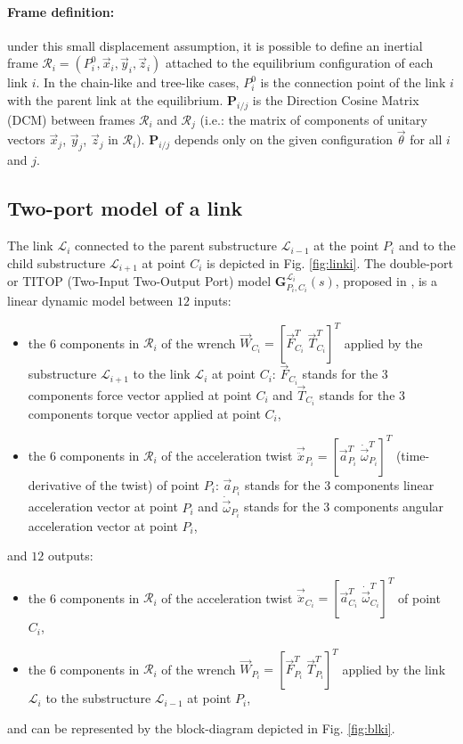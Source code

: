 \documentclass[smallcondensed]{svjour3}     %
\begin{document}
\paragraph{Frame definition:}
 under this small displacement assumption, it is possible to define an inertial frame $\mathcal{R}_i=(P_i^0,\vec{x}_i,\vec{y}_i,\vec{z}_i)$ attached to the equilibrium configuration of each link $i$. In the chain-like and tree-like cases, $P_i^0$ is the connection point of the link $i$ with the parent link at the equilibrium. 
 $\mathbf{P}_{i/j}$ is the Direction Cosine Matrix (DCM)
between frames $\mathcal{R}_i$ and $\mathcal{R}_j$ (i.e.: the matrix of components of unitary vectors $\vec{x}_j$, $\vec{y}_j$, $\vec{z}_j$ in $\mathcal{R}_i$). $\mathbf{P}_{i/j}$ depends only on the given configuration $\vec{\theta}$ for all $i$ and $j$.

 \subsection{Two-port model of a link} The link $\mathcal{L}_{i}$ connected to the parent substructure $\mathcal{L}_{i-1}$ at the point $P_i$ %
 and to the child substructure $\mathcal{L}_{i+1}$ at point $C_i$ is depicted in Fig. \ref{fig:linki}. The double-port or TITOP (Two-Input Two-Output Port) model $\mathbf{G}_{P_i,C_i}^{\mathcal{L}_i}(s)$, proposed in \cite{Alazard2015}, is a linear dynamic model between $12$ inputs:
\begin{itemize}
\item the 6 components in $\mathcal{R}_i$ of the wrench $\vec{W}_{C_i}=[\vec{F}_{C_i}^T\;\vec{T}_{C_i}^T]^T$ applied by the substructure $\mathcal{L}_{i+1}$ to the link $\mathcal{L}_{i}$ at point $C_i$: $\vec{F}_{C_i}$ stands for the 3 components force vector applied at point $C_i$ and $\vec{T}_{C_i}$ stands for the 3 components torque vector applied at point $C_i$,
\item the 6 components in $\mathcal{R}_i$ of the acceleration twist $\vec{\ddot{x}}_{P_i}=[\vec{a}_{P_i}^T\;\dot{\vec{\omega}}_{P_i}^T]^T$  (time-derivative of the twist) of point $P_i$: $\vec{a}_{P_i}$ stands for the 3 components linear acceleration vector at point $P_i$ and $\dot{\vec{\omega}}_{P_i}$ stands for the 3 components angular acceleration vector at point $P_i$,
\end{itemize}
and $12$ outputs:
\begin{itemize}
\item the 6 components in $\mathcal{R}_i$ of the acceleration twist $\vec{\ddot{x}}_{C_i}=[\vec{a}_{C_i}^T\;\dot{\vec{\omega}}_{C_i}^T]^T$  of point $C_i$,
\item the 6 components in $\mathcal{R}_i$ of the wrench $\vec{W}_{P_i}=[\vec{F}_{P_i}^T\;\vec{T}_{P_i}^T]^T$ applied by the link $\mathcal{L}_{i}$ to the substructure $\mathcal{L}_{i-1}$ at point $P_i$,
\end{itemize}
and can be represented by the block-diagram depicted in Fig. \ref{fig:blki}. 
\end{document}
